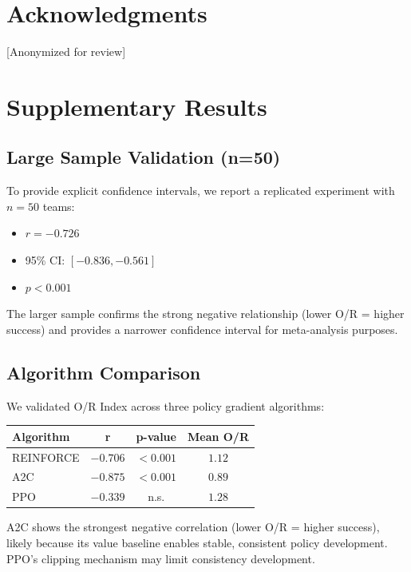 \documentclass[twoside]{article}
\theoremstyle{remark}
\begin{document}
\section*{Acknowledgments}

[Anonymized for review]




\newpage
\appendix

\section{Supplementary Results}

\subsection{Large Sample Validation (n=50)}

To provide explicit confidence intervals, we report a replicated experiment with $n = 50$ teams:
\begin{itemize}
    \item $r = -0.726$
    \item 95\% CI: $[-0.836, -0.561]$
    \item $p < 0.001$
\end{itemize}

The larger sample confirms the strong negative relationship (lower O/R = higher success) and provides a narrower confidence interval for meta-analysis purposes.

\subsection{Algorithm Comparison}

We validated O/R Index across three policy gradient algorithms:

\begin{center}
\begin{tabular}{lccc}
\toprule
\textbf{Algorithm} & \textbf{r} & \textbf{p-value} & \textbf{Mean O/R} \\
\midrule
REINFORCE & $-0.706$ & $< 0.001$ & $1.12$ \\
A2C & $-0.875$ & $< 0.001$ & $0.89$ \\
PPO & $-0.339$ & n.s. & $1.28$ \\
\bottomrule
\end{tabular}
\end{center}

A2C shows the strongest negative correlation (lower O/R = higher success), likely because its value baseline enables stable, consistent policy development. PPO's clipping mechanism may limit consistency development.
\end{document}
